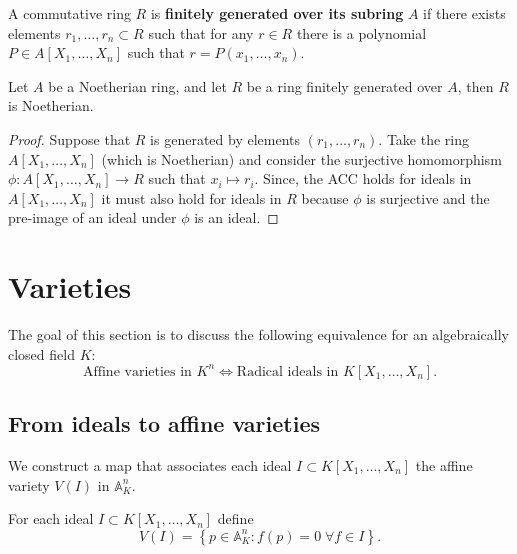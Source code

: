 \documentclass[12pt, a4paper]{article}
\renewcommand{\AA}{\mathbb A}
\begin{document}
\begin{definition}
    A commutative ring \(R\) is \textbf{finitely generated over its subring} \(A\) if there exists elements \(r_1,\ldots,r_n \subset R\) such that for any \(r \in R\) there is a polynomial \(P \in A[X_1,\ldots,X_n]\) such that \(r=P(x_1,\ldots,x_n)\).
\end{definition}

\begin{corollary}
    Let \(A\) be a Noetherian ring, and let \(R\) be a ring finitely generated over \(A\), then \(R\) is Noetherian.
\end{corollary}

\begin{proof}
    Suppose that \(R\) is generated by elements \((r_1,\ldots,r_n)\). Take the ring \(A[X_1,\ldots,X_n]\) (which is Noetherian) and consider the surjective homomorphism \(\phi:A[X_1,\ldots,X_n] \to R\) such that \(x_i \mapsto r_i\). Since, the ACC holds for ideals in \(A[X_1,\ldots,X_n]\) it must also hold for ideals in \(R\) because \(\phi\) is surjective and the pre-image of an ideal under \(\phi\) is an ideal.
\end{proof}

\section{Varieties}

\begin{mdnote}
    The goal of this section is to discuss the following equivalence for an algebraically closed field \(K\):
\[\text{Affine varieties in \(K^n\)} \iff \text{Radical ideals in \(K[X_1,\ldots,X_n]\)}.\]
\end{mdnote}

\subsection{From ideals to affine varieties}

\begin{mdnote}
    We construct a map that associates each ideal \(I \subset K[X_1,\ldots,X_n]\) the affine variety \(V(I)\) in \(\AA_K^n\). 
\end{mdnote}

\begin{definition}
    For each ideal \(I \subset K[X_1,\ldots,X_n]\) define 
    \[V(I) = \left\{ p \in \AA_K^n:f(p)=0 \; \forall f\in I \right\}.\]
\end{definition}
\end{document}
